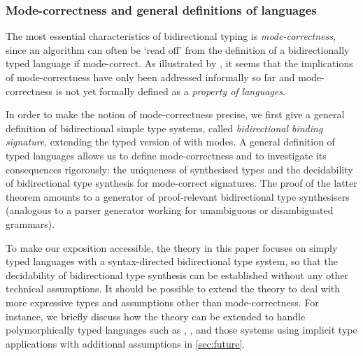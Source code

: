 

\subsubsection{Mode-correctness and general definitions of languages}
\label{sec:language-formalisation}
The most essential characteristics of bidirectional typing is \emph{mode-correctness}, since an algorithm can often be `read off' from the definition of a bidirectionally typed language if mode-correct.
As illustrated by \citet{Dunfield2021}, it seems that the implications of mode-correctness have only been addressed informally so far and mode-correctness is not yet formally defined as a \emph{property of languages}.

In order to make the notion of mode-correctness precise, we first give a general definition of bidirectional simple type systems, called \emph{bidirectional binding signature}, extending the typed version of  with modes.
A general definition of typed languages allows us to define mode-correctness and to investigate its consequences rigorously: the uniqueness of synthesised types and the decidability of bidirectional type synthesis for mode-correct signatures.
The proof of the latter theorem amounts to a generator of proof-relevant bidirectional type synthesisers (analogous to a parser generator working for unambiguous or disambiguated grammars).

To make our exposition accessible, the theory in this paper focuses on simply typed languages with a syntax-directed bidirectional type system, so that the decidability of bidirectional type synthesis can be established without any other technical assumptions.
It should be possible to extend the theory to deal with more expressive types and assumptions other than mode-correctness.
For instance, we briefly discuss how the theory can be extended to handle polymorphically typed languages such as \SystemF, \SystemFsub, and those systems using implicit type applications with additional assumptions in \cref{sec:future}.

